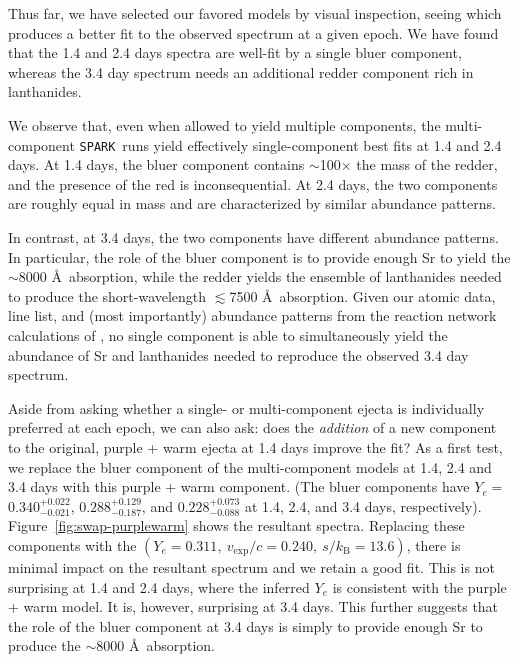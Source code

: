 \documentclass[twocolumn,twocolappendix]{aastex63}
\def\SPARK{\texttt{SPARK}}
\begin{document}
Thus far, we have selected our favored models by visual inspection, seeing which produces a better fit to the observed spectrum at a given epoch. We have found that the 1.4 and 2.4 days spectra are well-fit by a single bluer component, whereas the 3.4 day spectrum needs an additional redder component rich in lanthanides. 

We observe that, even when allowed to yield multiple components, the multi-component \SPARK~runs yield effectively single-component best fits at 1.4 and 2.4 days. At 1.4 days, the bluer component contains $\sim$100$\times$ the mass of the redder, and the presence of the red is inconsequential. At 2.4 days, the two components are roughly equal in mass and are characterized by similar abundance patterns. 

In contrast, at 3.4 days, the two components have different abundance patterns. In particular, the role of the bluer component is to provide enough Sr to yield the $\sim$8000 \AA~absorption, while the redder yields the ensemble of lanthanides needed to produce the short-wavelength $\lesssim$7500 \AA~absorption. Given our atomic data, line list, and (most importantly) abundance patterns from the reaction network calculations of \cite{wanajo18}, no single component is able to simultaneously yield the abundance of Sr and lanthanides needed to reproduce the observed 3.4 day spectrum.

Aside from asking whether a single- or multi-component ejecta is individually preferred at each epoch, we can also ask: does the \textit{addition} of a new component to the original, purple + warm ejecta at 1.4 days improve the fit? As a first test, we replace the bluer component of the multi-component models at 1.4, 2.4 and 3.4 days with this purple + warm component. (The bluer components have $Y_{e} = $ $ 0.340^{+0.022}_{-0.021}$, $0.288^{+0.129}_{-0.187}$, and $0.228^{+0.073}_{-0.088}$ at 1.4, 2.4, and 3.4 days, respectively). Figure~\ref{fig:swap-purplewarm} shows the resultant spectra. Replacing these components with the $(Y_e = 0.311,~v_{\mathrm{exp}}/c=0.240,~s / k_{\mathrm{B}}=13.6)$, there is minimal impact on the resultant spectrum and we retain a good fit.  This is not surprising at 1.4 and 2.4 days, where the inferred $Y_e$ is consistent with the purple + warm model. It is, however, surprising at 3.4 days. This further suggests that the role of the bluer component at 3.4 days is simply to provide enough Sr to produce the $\sim$8000 \AA~absorption. 
\end{document}
